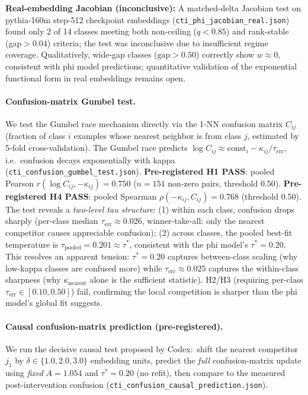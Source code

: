 \documentclass{article}
\begin{document}
\textbf{Real-embedding Jacobian (inconclusive):} A matched-delta Jacobian test on
pythia-160m step-512 checkpoint embeddings (\texttt{cti\_phi\_jacobian\_real.json}) found only
2 of 14 classes meeting both non-ceiling ($q<0.85$) and rank-stable (gap$>0.04$) criteria;
the test was inconclusive due to insufficient regime coverage. Qualitatively, wide-gap classes
($\mathrm{gap}>0.50$) correctly show $w\approx0$, consistent with phi model predictions;
quantitative validation of the exponential functional form in real embeddings remains open.

\paragraph{Confusion-matrix Gumbel test.}
We test the Gumbel race mechanism directly via the 1-NN confusion matrix $C_{ij}$ (fraction
of class $i$ examples whose nearest neighbor is from class $j$, estimated by 5-fold
cross-validation).
The Gumbel race predicts $\log C_{ij}\approx \mathrm{const}_i - \kappa_{ij}/\tau_{\mathrm{err}}$,
i.e.\ confusion decays exponentially with kappa (\texttt{cti\_confusion\_gumbel\_test.json}).
\textbf{Pre-registered H1 PASS}: pooled Pearson $r(\log C_{ij}, -\kappa_{ij})=0.750$ ($n=151$
non-zero pairs, threshold 0.50).
\textbf{Pre-registered H4 PASS}: pooled Spearman $\rho(-\kappa_{ij}, C_{ij})=0.768$ (threshold 0.50).
The test reveals a \emph{two-level tau structure}: (1) within each class, confusion drops
sharply (per-class median $\tau_\mathrm{err}\approx0.026$, winner-take-all: only the nearest
competitor causes appreciable confusion); (2) across classes, the pooled best-fit temperature
is $\tau_\mathrm{pooled}=0.201\approx\tau^*$, consistent with the phi model's $\tau^*=0.20$.
This resolves an apparent tension: $\tau^*=0.20$ captures between-class scaling (why low-kappa
classes are confused more) while $\tau_\mathrm{err}\approx0.025$ captures the within-class
sharpness (why $\kappa_\mathrm{nearest}$ alone is the sufficient statistic).
H2/H3 (requiring per-class $\tau_\mathrm{err}\in[0.10,0.50]$) fail, confirming the
local competition is sharper than the phi model's global fit suggests.

\paragraph{Causal confusion-matrix prediction (pre-registered).}
We run the decisive causal test proposed by Codex:\ shift the nearest competitor $j_1$ by
$\delta\in\{1.0,2.0,3.0\}$ embedding units, predict the \emph{full} confusion-matrix update
using \emph{fixed} $A=1.054$ and $\tau^*=0.20$ (no refit), then compare to the measured
post-intervention confusion (\texttt{cti\_confusion\_causal\_prediction.json}).
\end{document}
